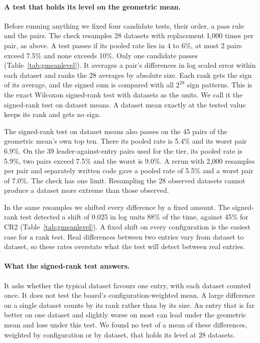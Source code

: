 \documentclass{article}
\begin{document}
\paragraph{A test that holds its level on the geometric mean.} Before running anything we
fixed four candidate tests, their order, a pass rule and the pairs. The check resamples 28
datasets with replacement 1{,}000 times per pair, as above. A test passes if its pooled rate
lies in 4 to 6\%, at most 2 pairs exceed 7.5\% and none exceeds 10\%. Only one candidate
passes (Table~\ref{tab:gmeanlevel}). It averages a pair's differences in log scaled error
within each dataset and ranks the 28 averages by absolute size. Each rank gets the sign of its
average, and the signed sum is compared with all $2^{28}$ sign patterns. This is the exact
Wilcoxon signed-rank test with datasets as the units. We call it the signed-rank test on
dataset means. A dataset mean exactly at the tested value keeps its rank and gets no sign.

The signed-rank test on dataset means also passes on the 45 pairs of the geometric mean's own
top ten. There its pooled rate is 5.4\% and its worst pair 6.9\%. On the 39
leader-against-entry pairs used for the tier, its pooled rate is 5.9\%, two pairs exceed
7.5\% and the worst is 9.0\%. A rerun with 2{,}000 resamples per pair and separately written
code gave a pooled rate of 5.5\% and a worst pair of 7.0\%. The check has one limit.
Resampling the 28 observed datasets cannot produce a dataset more extreme than those observed.

In the same resamples we shifted every difference by a fixed amount. The signed-rank test
detected a shift of 0.025 in log units 88\% of the time, against 45\% for CR2
(Table~\ref{tab:gmeanlevel}). A fixed shift on every configuration is the easiest case for a
rank test. Real differences between two entries vary from dataset to dataset, so these rates
overstate what the test will detect between real entries.

\paragraph{What the signed-rank test answers.} It asks whether the typical dataset favours one
entry, with each dataset counted once. It does not test the board's configuration-weighted
mean. A large difference on a single dataset counts by its rank rather than by its size. An
entry that is far better on one dataset and slightly worse on most can lead under the
geometric mean and lose under this test. We found no test of a mean of these differences,
weighted by configuration or by dataset, that holds its level at 28 datasets.
\end{document}
